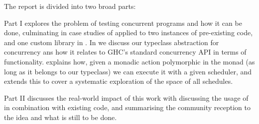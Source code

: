 The report is divided into two broad parts:

Part I explores the problem of testing concurrent programs and how it
can be done, culminating in case studies of \dejafu{} applied to two
instances of pre-existing code, and one custom library in
. In  we discuss our typeclass
abstraction for concurrency ans how it relates to GHC's standard
concurrency API in terms of functionality.  explains
how, given a monadic action polymorphic in the monad (as long as it
belongs to our typeclass) we can execute it with a given scheduler,
and  extends this to cover a systematic exploration of the
space of all schedules.

Part II discusses the real-world impact of this work with
 discussing the usage of \dejafu{} in combination with
existing code, and  summarising the community
reception to the idea and what is still to be done.
